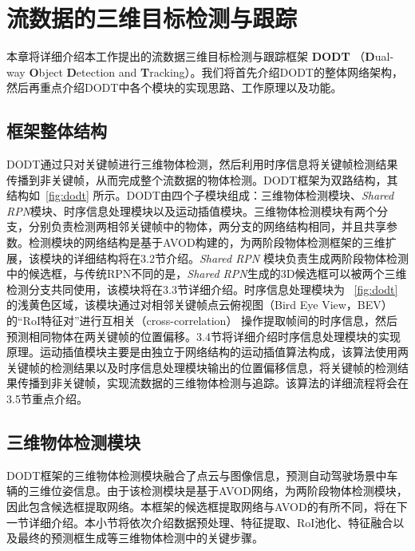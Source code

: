 
\chapter{流数据的三维目标检测与跟踪}
\label{methodology}
本章将详细介绍本工作提出的流数据三维目标检测与跟踪框架 \textbf{DODT} （\textbf{D}ual-way \textbf{O}bject \textbf{D}etection and \textbf{T}racking）。我们将首先介绍DODT的整体网络架构，然后再重点介绍DODT中各个模块的实现思路、工作原理以及功能。

\section{框架整体结构}
\label{total_structure}


DODT通过只对关键帧进行三维物体检测，然后利用时序信息将关键帧检测结果传播到非关键帧，从而完成整个流数据的物体检测。DODT框架为双路结构，其结构如\figurename \, \ref{fig:dodt} 所示。DODT由四个子模块组成：三维物体检测模块、\textit{Shared RPN}模块、时序信息处理模块以及运动插值模块。三维物体检测模块有两个分支，分别负责检测两相邻关键帧中的物体，两分支的网络结构相同，并且共享参数。检测模块的网络结构是基于AVOD\cite{ku2018joint}构建的，为两阶段物体检测框架的三维扩展，该模块的详细结构将在3.2节介绍。\textit{Shared RPN} 模块负责生成两阶段物体检测中的候选框，与传统RPN不同的是，\textit{Shared RPN}生成的3D候选框可以被两个三维检测分支共同使用，该模块将在3.3节详细介绍。时序信息处理模块为 \figurename \, \ref{fig:dodt} 的浅黄色区域，该模块通过对相邻关键帧点云俯视图（Bird Eye View，BEV）的“RoI特征对”进行互相关（cross-correlation） 操作提取帧间的时序信息，然后预测相同物体在两关键帧的位置偏移。3.4节将详细介绍时序信息处理模块的实现原理。运动插值模块主要是由独立于网络结构的运动插值算法构成，该算法使用两关键帧的检测结果以及时序信息处理模块输出的位置偏移信息，将关键帧的检测结果传播到非关键帧，实现流数据的三维物体检测与追踪。该算法的详细流程将会在3.5节重点介绍。


\section{三维物体检测模块}
\label{3d_detection_module}

DODT框架的三维物体检测模块融合了点云与图像信息，预测自动驾驶场景中车辆的三维位姿信息。由于该检测模块是基于AVOD\cite{ku2018joint}网络，为两阶段物体检测模块，因此包含候选框提取网络。本框架的候选框提取网络与AVOD的有所不同，将在下一节详细介绍。本小节将依次介绍数据预处理、特征提取、RoI池化、特征融合以及最终的预测框生成等三维物体检测中的关键步骤。

